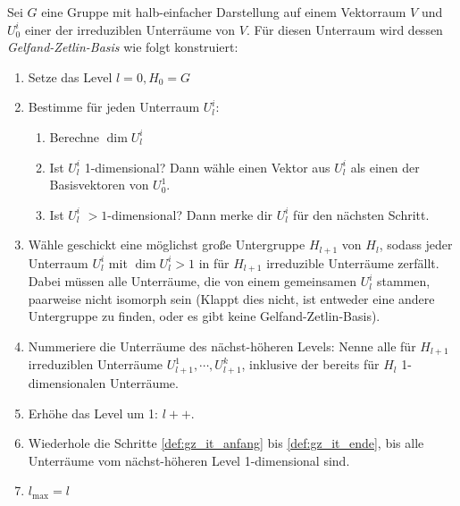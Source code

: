  \begin{definition}
 	\label{def:konstruktion_gz_basis}
	Sei $G$ eine Gruppe mit halb-einfacher Darstellung auf einem Vektorraum $V$ und $U^i_0$ einer der irreduziblen Unterräume von $V$. Für diesen Unterraum wird dessen \emph{Gelfand-Zetlin-Basis} wie folgt konstruiert:
	\begin{enumerate}[label={\arabic*.)}]
		\item Setze das Level $l=0, H_0 = G$
		\item Bestimme für jeden Unterraum $U_l^i$: \label{def:gz_it_anfang}
		\begin{enumerate}
			\item Berechne $\dim{U_l^i}$
			\item Ist $U_l^i$ 1-dimensional? Dann wähle einen Vektor aus $U_l^i$ als einen der Basisvektoren von $U^1_0$.
			\item Ist $U_l^i$ $>1$-dimensional? Dann merke dir $U_l^i$ für den nächsten Schritt.
		\end{enumerate}
		\item Wähle geschickt eine möglichst große Untergruppe $H_{l+1}$ von $H_{l}$, sodass jeder Unterraum $U_l^i$ mit $\dim{U_l^i}>1$ in für $H_{l+1}$ irreduzible Unterräume  zerfällt. Dabei müssen alle Unterräume, die von einem gemeinsamen $U_l^i$ stammen, paarweise nicht isomorph sein (Klappt dies nicht, ist entweder eine andere Untergruppe zu finden, oder es gibt keine Gelfand-Zetlin-Basis). \label{def:gz_it_ugschritt}
		\item Nummeriere die Unterräume des nächst-höheren Levels: Nenne alle für $H_{l+1}$ irreduziblen Unterräume $U_{l+1}^{1}, \cdots, U_{l+1}^{k}$, inklusive der bereits für $H_l$ 1-dimensionalen Unterräume.
		\item Erhöhe das Level um 1: $l++$. \label{def:gz_it_ende}
		\item Wiederhole die Schritte \ref{def:gz_it_anfang} bis \ref{def:gz_it_ende}, bis alle Unterräume vom nächst-höheren Level 1-dimensional sind.
		\item $l_{\text{max}} = l$
		\end{enumerate}
\end{definition}
